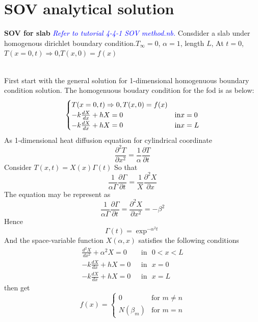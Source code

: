\section{SOV analytical solution}
\begin{example}
\textbf{SOV for slab}
\textcolor{blue} {\emph{Refer to tutorial 4-4-1 SOV method.nb.}}
Consdider a slab under homogenous dirichlet boundary condition.$T_\infty=0$, $\alpha=1$, length $L$, 
At $t=0$, $T(x=0,t)\Rightarrow0$,$T(x,0)=f(x)$
\end{example}
\begin{solution}
~\\
First start with the general solution for 1-dimensional homogenuous boundary condition solution. The homogenuous boudary condition for the fod is as below:
\begin{equation}
\begin{cases}
T(x=0,t)\Rightarrow0, T(x,0)=f(x)\\
-k\frac{dX}{dx}+hX=0 &$in$ x=0\\
-k\frac{dX}{dx}+hX=0 &$in$ x=L
\end{cases}
\end{equation}
As 1-dimensional heat diffusion equation for cylindrical coordinate
$$\frac{\partial^2 T}{\partial x^2}=\frac{1}{\alpha}\frac{\partial T}{\partial t}$$
Consider $T(x,t)=X(x)\Gamma(t)$
So that
$$\frac{1}{\alpha\Gamma}\frac{\partial\Gamma}{\partial t}=\frac{1}{X}\frac{\partial^2 X}{\partial x}$$
The equation may be represent as
$$\frac{1}{\alpha\Gamma}\frac{\partial\Gamma}{\partial t}
=\frac{\partial^2 X}{\partial x^2}=-\beta^2$$
Hence 
$$\Gamma(t)=\exp^{-\alpha^2 t}$$
And the space-variable function $X(\alpha,x)$ satisfies the following conditions\\
\begin{align}
\frac{d^2 X}{d x^2}+\alpha^2X=0 &\text{~~in~~} 0<x<L\\
-k\frac{dX}{dx}+hX=0 &\text{~~in~~} x=0\\
-k\frac{dX}{dx}+hX=0 &\text{~~in~~} x=L
\end{align}
then get
\[
 f(x) =
  \begin{cases}
   0 & \text{for } m \neq n \\
   N(\beta_m)      & \text{for } m=n
  \end{cases}
\]
  

\end{solution}

